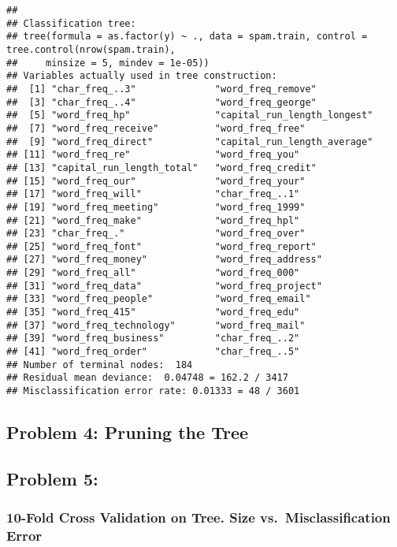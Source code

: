 \documentclass[]{article}
\begin{document}
\begin{verbatim}
## 
## Classification tree:
## tree(formula = as.factor(y) ~ ., data = spam.train, control = tree.control(nrow(spam.train), 
##     minsize = 5, mindev = 1e-05))
## Variables actually used in tree construction:
##  [1] "char_freq_..3"              "word_freq_remove"          
##  [3] "char_freq_..4"              "word_freq_george"          
##  [5] "word_freq_hp"               "capital_run_length_longest"
##  [7] "word_freq_receive"          "word_freq_free"            
##  [9] "word_freq_direct"           "capital_run_length_average"
## [11] "word_freq_re"               "word_freq_you"             
## [13] "capital_run_length_total"   "word_freq_credit"          
## [15] "word_freq_our"              "word_freq_your"            
## [17] "word_freq_will"             "char_freq_..1"             
## [19] "word_freq_meeting"          "word_freq_1999"            
## [21] "word_freq_make"             "word_freq_hpl"             
## [23] "char_freq_."                "word_freq_over"            
## [25] "word_freq_font"             "word_freq_report"          
## [27] "word_freq_money"            "word_freq_address"         
## [29] "word_freq_all"              "word_freq_000"             
## [31] "word_freq_data"             "word_freq_project"         
## [33] "word_freq_people"           "word_freq_email"           
## [35] "word_freq_415"              "word_freq_edu"             
## [37] "word_freq_technology"       "word_freq_mail"            
## [39] "word_freq_business"         "char_freq_..2"             
## [41] "word_freq_order"            "char_freq_..5"             
## Number of terminal nodes:  184 
## Residual mean deviance:  0.04748 = 162.2 / 3417 
## Misclassification error rate: 0.01333 = 48 / 3601
\end{verbatim}

\hypertarget{problem-4-pruning-the-tree}{%
\subsection{Problem 4: Pruning the
Tree}\label{problem-4-pruning-the-tree}}

\hypertarget{problem-5}{%
\subsection{Problem 5:}\label{problem-5}}

\hypertarget{fold-cross-validation-on-tree.-size-vs.-misclassification-error}{%
\subsubsection{10-Fold Cross Validation on Tree. Size
vs.~Misclassification
Error}\label{fold-cross-validation-on-tree.-size-vs.-misclassification-error}}
\end{document}
